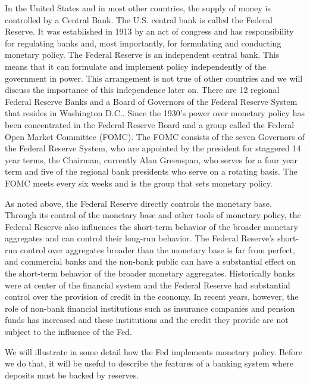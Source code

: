 \documentclass[letterpaper,12pt]{article}
\begin{document}
In the United States and in most other countries, the supply of
money is controlled by a Central Bank. The U.S. central bank is
called the Federal Reserve. It was established in 1913 by an act of
congress and has responsibility for regulating banks and, most
importantly, for formulating and conducting monetary policy. The
Federal Reserve is an independent central bank. This means that it
can formulate and implement policy independently of the government
in power. This arrangement is not true of other countries and we
will discuss the importance of this independence later on. There are
12 regional Federal Reserve Banks and a Board of Governors of the
Federal Reserve System that resides in Washington D.C.. Since the
1930's power over monetary policy has been concentrated in the
Federal Reserve Board and a group called the Federal Open Market
Committee (FOMC). The FOMC consists of the seven Governors of the
Federal Reserve System, who are appointed by the president for
staggered 14 year terms, the Chairman, currently Alan Greenspan, who
serves for a four year term and five of the regional bank presidents
who serve on a rotating basis. The FOMC meets every six weeks and is
the group that sets monetary policy.

As noted above, the Federal Reserve directly controls the monetary
base. Through its control of the monetary base and other tools of
monetary policy, the Federal Reserve also influences the short-term
behavior of the broader monetary aggregates and can control their
long-run behavior. The Federal Reserve's short-run control over
aggregates broader than the monetary base is far from perfect, and
commercial banks and the non-bank public can have a substantial
effect on the short-term behavior of the broader monetary
aggregates. Historically banks were at center of the financial
system and the Federal Reserve had substantial control over the
provision of credit in the economy. In recent years, however, the
role of non-bank financial institutions such as insurance companies
and pension funds has increased and these institutions and the
credit they provide are not subject to the influence of the Fed.

We will illustrate in some detail how the Fed implements monetary
policy. Before we do that, it will be useful to describe the
features of a banking system where deposits must be backed by
reserves.
\end{document}

